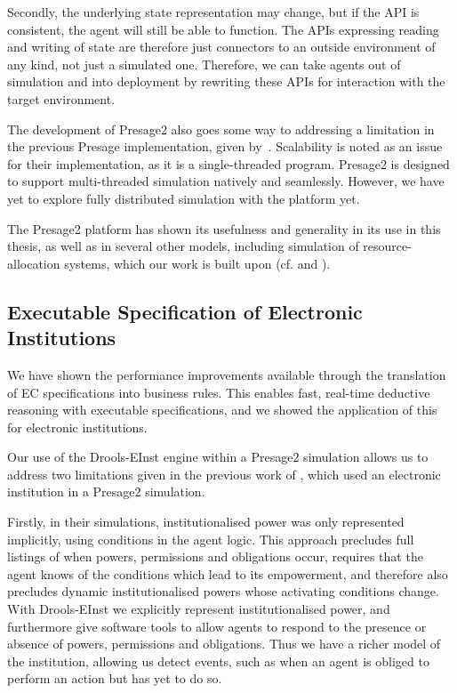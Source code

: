 Secondly, the underlying state representation may change, but if the \ac{API}
is consistent, the agent will still be able to function. The \acp{API} expressing
reading and writing of state are therefore just connectors to an outside
environment of any kind, not just a simulated one. Therefore, we can take
agents out of simulation and into deployment by rewriting these \acp{API} for
interaction with the target environment.

The development of Presage2 also goes some way to addressing a limitation in
the previous Presage implementation, given by~\citet{Neville2011}. Scalability is noted as an issue for their implementation, as it is a single-threaded
program. Presage2 is designed to support multi-threaded simulation natively
and seamlessly. However, we have yet to explore fully distributed simulation
with the platform yet.

The Presage2 platform has shown its usefulness and generality in its use in
this thesis, as well as in several other models, including simulation
of resource-allocation systems, which our work is built upon (cf.
\citet{Schaumeier2013} and \citet{Pitt2014}).

\subsection{Executable Specification of Electronic Institutions}

We have shown the performance improvements available through the translation
of \ac{EC} specifications into business rules. This enables fast, real-time
deductive reasoning with executable specifications, and we showed the
application of this for electronic institutions.

Our use of the Drools-EInst engine within a Presage2 simulation allows us to
address two limitations given in the previous work of \citet{Schaumeier2013},
which used an electronic institution in a Presage2 simulation.

Firstly, in their simulations, institutionalised power was only represented implicitly,
using conditions in the agent logic. This approach precludes full listings of when
powers, permissions and obligations occur, requires that the agent knows of the
conditions which lead to its empowerment, and therefore also precludes dynamic
institutionalised powers whose activating conditions change. With Drools-EInst
we explicitly represent institutionalised power, and furthermore give software
tools to allow agents to respond to the presence or absence of powers,
permissions and obligations. Thus we have a richer model of the institution,
allowing us detect events, such as when an agent is obliged to perform an
action but has yet to do so.

